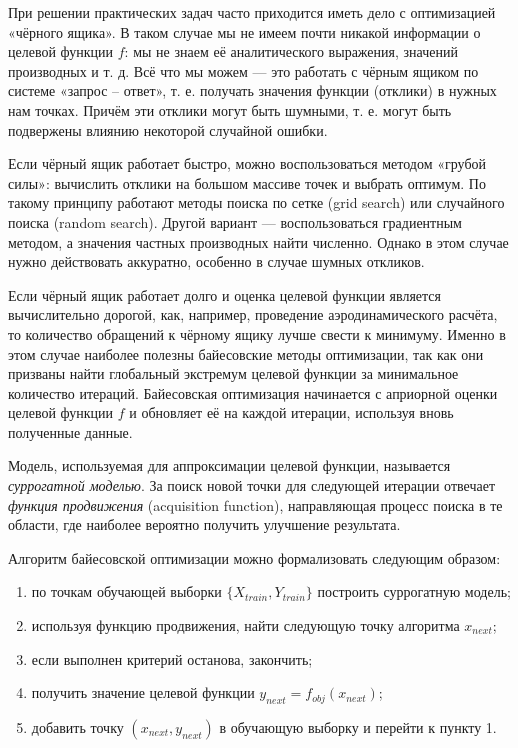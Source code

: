 \documentclass[11pt,a4paper]{article}
\providecommand{\tightlist}{%
      \setlength{\itemsep}{0pt}\setlength{\parskip}{0pt}}
\begin{document}
    При решении практических задач часто приходится иметь дело с
оптимизацией «чёрного ящика». В таком случае мы не имеем почти никакой
информации о целевой функции \(f\): мы не знаем её аналитического
выражения, значений производных и т. д. Всё что мы можем --- это
работать с чёрным ящиком по системе «запрос -- ответ», т. е. получать
значения функции (отклики) в нужных нам точках. Причём эти отклики могут
быть шумными, т. е. могут быть подвержены влиянию некоторой случайной
ошибки.

Если чёрный ящик работает быстро, можно воспользоваться методом «грубой
силы»: вычислить отклики на большом массиве точек и выбрать оптимум. По
такому принципу работают методы поиска по сетке (grid search) или
случайного поиска (random search). Другой вариант --- воспользоваться
градиентным методом, а значения частных производных найти численно.
Однако в этом случае нужно действовать аккуратно, особенно в случае
шумных откликов.

Если чёрный ящик работает долго и оценка целевой функции является
вычислительно дорогой, как, например, проведение аэродинамического
расчёта, то количество обращений к чёрному ящику лучше свести к
минимуму. Именно в этом случае наиболее полезны байесовские методы
оптимизации, так как они призваны найти глобальный экстремум целевой
функции за минимальное количество итераций. Байесовская оптимизация
начинается с априорной оценки целевой функции \(f\) и обновляет её на
каждой итерации, используя вновь полученные данные.

Модель, используемая для аппроксимации целевой функции, называется
\emph{суррогатной моделью}. За поиск новой точки для следующей итерации
отвечает \emph{функция продвижения} (acquisition function), направляющая
процесс поиска в те области, где наиболее вероятно получить улучшение
результата.

    Алгоритм байесовской оптимизации можно формализовать следующим образом:

\begin{enumerate}
\def\labelenumi{\arabic{enumi}.}
\tightlist
\item
  по точкам обучающей выборки \(\{X_{train}, Y_{train}\}\) построить
  суррогатную модель;
\item
  используя функцию продвижения, найти следующую точку алгоритма
  \(x_{next}\);
\item
  если выполнен критерий останова, закончить;
\item
  получить значение целевой функции \(y_{next} = f_{obj}(x_{next})\);
\item
  добавить точку \((x_{next}, y_{next})\) в обучающую выборку и перейти
  к пункту 1.
\end{enumerate}
\end{document}
